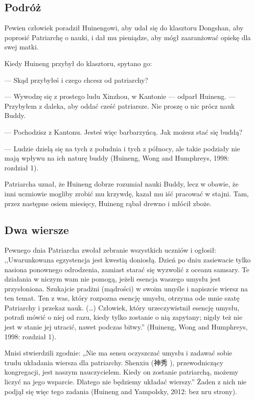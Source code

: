\subsection{Podróż}
Pewien człowiek poradził Huinengowi, aby udał się do klasztoru Dongshan, aby poprosić Patriarchę o nauki, i dał mu pieniądze, aby mógł zaaranżować opiekę dla swej matki.

Kiedy Huineng przybył do klasztoru, spytano go:

--- Skąd przybyłeś i czego chcesz od patriarchy?

--- Wywodzę się z prostego ludu Xinzhou, w Kantonie --- odparł Huineng. --- Przybyłem z daleka, aby oddać cześć patriarsze. Nie proszę o nic prócz nauk Buddy.

--- Pochodzisz z Kantonu. Jesteś więc barbarzyńcą. Jak możesz stać się buddą?

--- Ludzie dzielą się na tych z południa i tych z północy, ale takie podziały nie mają wpływu na ich naturę buddy (Huineng, Wong and Humphreys, 1998: rozdział 1).

Patriarcha uznał, że Huineng dobrze rozumiał nauki Buddy, lecz w obawie, że inni uczniowie mogliby zrobić mu krzywdę, kazał mu iść pracować w stajni. Tam, przez następne osiem miesięcy, Huineng rąbał drewno i młócił zboże.

\subsection{Dwa wiersze}

Pewnego dnia Patriarcha zwołał zebranie wszystkich uczniów i ogłosił: ,,Uwarunkowana egzystencja jest kwestią doniosłą. Dzień po dniu zasiewacie tylko nasiona ponownego odrodzenia, zamiast starać się wyzwolić z oceanu samsary. Te działania w niczym wam nie pomogą, jeżeli esencja waszego umysłu jest przysłoniona. Szukajcie pradżni (mądrości) w swoim umyśle i napiszcie wiersz na ten temat. Ten z was, który rozpozna esencję umysłu, otrzyma ode mnie szatę Patriarchy i przekaz nauk. (\ldots) Człowiek, który urzeczywistnił esencję umysłu, potrafi mówić o niej od razu, kiedy tylko zostanie o nią zapytany; nigdy też nie jest w stanie jej utracić, nawet podczas bitwy.'' (Huineng, Wong and Humphreys, 1998: rozdział 1).

Mnisi stwierdzili zgodnie: „Nie ma sensu oczyszczać umysłu i zadawać sobie trudu układania wiersza dla patriarchy. Shenxiu (神秀 ), przewodniczący kongregacji, jest naszym nauczycielem. Kiedy on zostanie patriarchą, możemy liczyć na jego wsparcie. Dlatego nie będziemy układać wierszy.” Żaden z nich nie podjął się więc tego zadania (Huineng and Yampolsky, 2012: bez nru strony).


